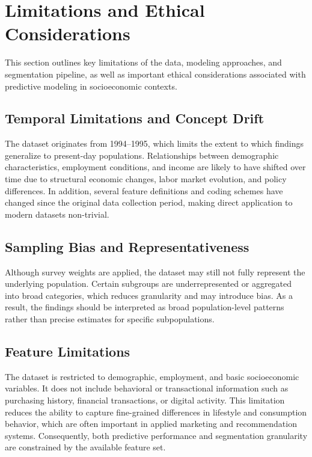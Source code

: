 
\section{Limitations and Ethical Considerations}

This section outlines key limitations of the data, modeling approaches, and segmentation pipeline, as well as important ethical considerations associated with predictive modeling in socioeconomic contexts.

\subsection{Temporal Limitations and Concept Drift}

The dataset originates from 1994--1995, which limits the extent to which findings generalize to present-day populations. Relationships between demographic characteristics, employment conditions, and income are likely to have shifted over time due to structural economic changes, labor market evolution, and policy differences. In addition, several feature definitions and coding schemes have changed since the original data collection period, making direct application to modern datasets non-trivial.

\subsection{Sampling Bias and Representativeness}

Although survey weights are applied, the dataset may still not fully represent the underlying population. Certain subgroups are underrepresented or aggregated into broad categories, which reduces granularity and may introduce bias. As a result, the findings should be interpreted as broad population-level patterns rather than precise estimates for specific subpopulations.

\subsection{Feature Limitations}

The dataset is restricted to demographic, employment, and basic socioeconomic variables. It does not include behavioral or transactional information such as purchasing history, financial transactions, or digital activity. This limitation reduces the ability to capture fine-grained differences in lifestyle and consumption behavior, which are often important in applied marketing and recommendation systems. Consequently, both predictive performance and segmentation granularity are constrained by the available feature set.


